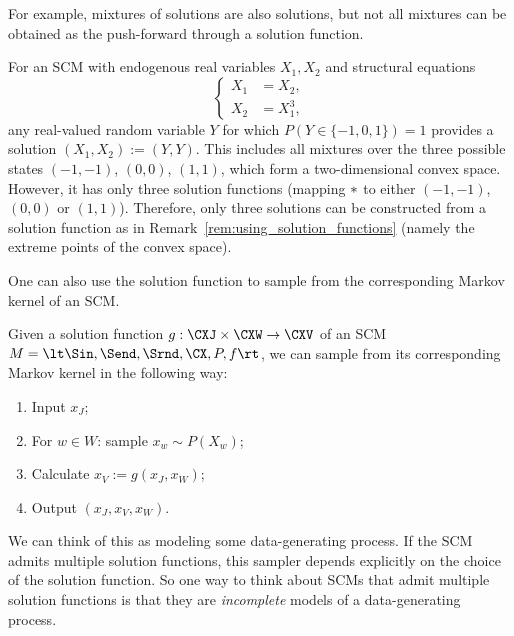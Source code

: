 For example, mixtures of solutions are also solutions, but not all mixtures can be obtained as the push-forward through a solution function.
\begin{Eg}\label{eg:not_each_solution_from_push_forward}
For an SCM with endogenous real variables $X_1,X_2$ and structural equations 
$$\begin{cases}
  X_1 &= X_2,\\
  X_2 &= X_1^3,
\end{cases}$$
any real-valued random variable $Y$ for which $P(Y \in \{-1,0,1\}) = 1$
provides a solution $(X_1,X_2) := (Y,Y)$. This includes all mixtures over the three
possible states $(-1,-1)$, $(0,0)$, $(1,1)$, which form a two-dimensional convex
space. However, it has only three solution functions (mapping $*$ to
either $(-1,-1)$, $(0,0)$ or $(1,1)$).
Therefore, only three solutions can be constructed from a solution function as in Remark~\ref{rem:using_solution_functions} (namely the extreme points of the convex space).
\end{Eg}

One can also use the solution function to sample from the corresponding Markov kernel of an SCM. 
\begin{Rem}\label{rem:sampling_from_scm}
  Given a solution function $g : \CXJ \times \CXW \to \CXV$ of an SCM $M = \lt \Sin, \Send, \Srnd, \CX, P, f \rt$,
  we can sample from its corresponding Markov kernel in the following way:
\begin{enumerate}
  \item Input $x_J$;
  \item For $w \in W$: sample $x_w \sim P(X_w)$;
  \item Calculate $x_{V} := g(x_J,x_W)$;
  \item Output $(x_J,x_V,x_W)$.
\end{enumerate}
\end{Rem}
We can think of this as modeling some data-generating process.
If the SCM admits multiple solution functions, this sampler depends explicitly on the choice of the solution function.
So one way to think about SCMs that admit multiple solution functions is that they are \emph{incomplete} models of a data-generating process.


